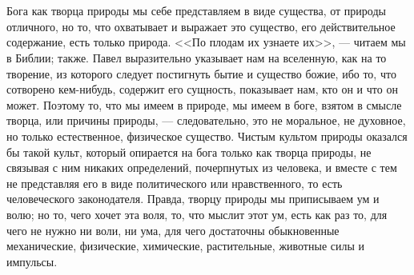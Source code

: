\documentclass[12pt,oneside]{book}
\begin{document}
\chapter{}

Бога как творца природы мы себе представляем в виде существа, от природы отличного, но то, что охватывает и выражает это существо, его действительное содержание, есть только природа. <<По плодам их узнаете их>>, --- читаем мы в Библии; также. Павел выразительно указывает нам на вселенную, как на то творение, из которого следует постигнуть бытие и существо божие, ибо то, что сотворено кем-нибудь, содержит его сущность, показывает нам, кто он и что он может. Поэтому то, что мы имеем в природе, мы имеем в боге, взятом в смысле творца, или причины природы, --- следовательно, это не моральное, не духовное, но только естественное, физическое существо. Чистым культом природы оказался бы такой культ, который опирается на бога только как творца природы, не связывая с ним никаких определений, почерпнутых из человека, и вместе с тем не представляя его в виде политического или нравственного, то есть человеческого законодателя. Правда, творцу природы мы приписываем ум и волю; но то, чего хочет эта воля, то, что мыслит этот ум, есть как раз то, для чего не нужно ни воли, ни ума, для чего достаточны обыкновенные механические, физические, химические, растительные, животные силы и импульсы.



\chapter{}
\end{document}
